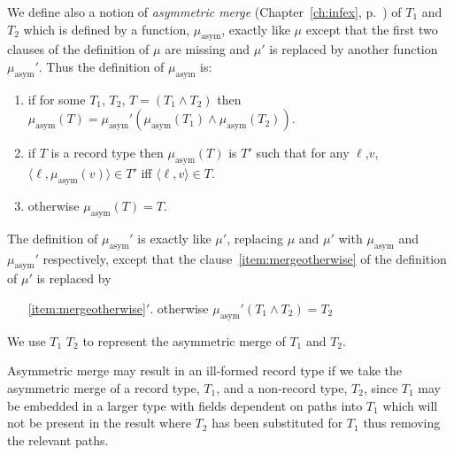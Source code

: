 We define also a notion of \textit{asymmetric merge}
(Chapter~\ref{ch:infex}, p.~\pageref{pg:asymmerge}) of $T_1$ and
$T_2$ which is defined by a function, $\mu_{\mathrm{asym}}$, exactly
like $\mu$ except that the first two clauses of the definition of
$\mu$ are missing and $\mu'$ is replaced by another function
$\mu_{\mathrm{asym}}'$.  Thus the definition of $\mu_{\mathrm{asym}}$
is:
\begin{enumerate} 
 
\item if for some $T_1$, $T_2$, $T=(T_1\wedge T_2)$ then
  $\mu_{\mathrm{asym}}(T)=\mu_{\mathrm{asym}}'(\mu_{\mathrm{asym}}(T_1)\wedge\mu_{\mathrm{asym}}(T_2))$. 
 
\item if $T$ is a record type then $\mu_{\mathrm{asym}}(T)$ is $T'$ such that for any
  $\ell$,$v$, $\langle\ell,\mu_{\mathrm{asym}}(v)\rangle\in T'$ iff
  $\langle\ell,v\rangle\in T$.

\item otherwise $\mu_{\mathrm{asym}}(T)=T$.
 
\end{enumerate}

The definition of $\mu_{\mathrm{asym}}'$ is exactly like $\mu'$,
replacing $\mu$ and $\mu'$ with $\mu_{\mathrm{asym}}$ and $\mu_{\mathrm{asym}}'$ respectively, except that
the
clause~\ref{item:mergeotherwise} of the definition of $\mu'$ is replaced by 
\begin{enumerate} 
 
\item[\ref{item:mergeotherwise}$'$.] otherwise $\mu_{\mathrm{asym}}'(T_1\wedge T_2)=T_2$ 
 
\end{enumerate} 
  
We use $T_1$ \fbox{\d{$\wedge$}} $T_2$  to represent the asymmetric
merge of $T_1$ and $T_2$.  

Asymmetric merge may result in an ill-formed record type if we take
the asymmetric merge of a record type, $T_1$, and a non-record type,
$T_2$, since $T_1$ may be embedded in a larger type with fields
dependent on paths into $T_1$ which will not be present in the result
where $T_2$ has been substituted for $T_1$ thus removing the relevant
paths.  %

